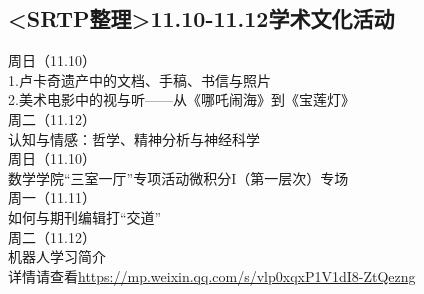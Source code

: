 \documentclass[letterpaper, 12pt]{article}
\begin{document}
\begin{multicols}{2}
\section{<SRTP整理>11.10-11.12学术文化活动}
周日（11.10）\\
1.卢卡奇遗产中的文档、手稿、书信与照片\\
2.美术电影中的视与听——从《哪吒闹海》到《宝莲灯》\\
周二（11.12）\\
认知与情感：哲学、精神分析与神经科学\\
周日（11.10）\\
数学学院“三室一厅”专项活动微积分I（第一层次）专场\\
周一（11.11）\\
如何与期刊编辑打“交道”\\
周二（11.12）\\
机器人学习简介\\
详情请查看\url{https://mp.weixin.qq.com/s/vlp0xqxP1V1dI8-ZtQezng}


\end{multicols} 
\end{document}
